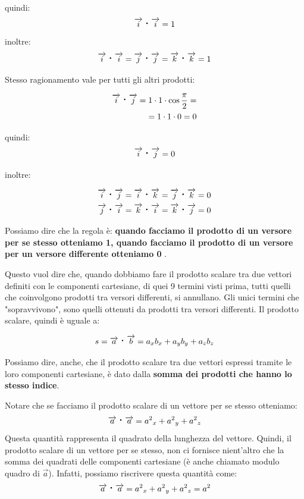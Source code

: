 quindi:
$$ \overrightarrow{i} \prodscal \overrightarrow{i} = 1$$
inoltre:
$$ \overrightarrow{i} \prodscal \overrightarrow{i} = \overrightarrow{j} \prodscal \overrightarrow{j} = \overrightarrow{k} \prodscal \overrightarrow{k} = 1 $$

Stesso ragionamento vale per tutti gli altri prodotti:

\begin{align*}
\overrightarrow{i} \prodscal \overrightarrow{j} = 1 	\cdot 1 \cdot \cos \frac{\pi}{2} = \\
 = 1 \cdot 1 \cdot 0 = 0
\end{align*}

quindi:
$$ \overrightarrow{i} \prodscal \overrightarrow{j} = 0 $$

inoltre:

\begin{align*}
\overrightarrow{i} \prodscal \overrightarrow{j} = \overrightarrow{i} \prodscal \overrightarrow{k} = \overrightarrow{j} \prodscal \overrightarrow{k} = 0 \\
\overrightarrow{j} \prodscal \overrightarrow{i} = \overrightarrow{k} \prodscal \overrightarrow{i} = \overrightarrow{k} \prodscal \overrightarrow{j} = 0
\end{align*}

Possiamo dire che la regola è: \textbf{quando facciamo il prodotto di un versore per se stesso otteniamo 1, quando facciamo il prodotto di un versore per un versore differente otteniamo 0} .

Questo vuol dire che, quando dobbiamo fare il prodotto scalare tra due vettori definiti con le componenti cartesiane,  di quei 9 termini visti prima, tutti quelli che coinvolgono prodotti tra versori differenti, si annullano. Gli unici termini che "sopravvivono", sono quelli ottenuti da prodotti tra versori differenti. Il prodotto scalare, quindi è uguale a:

$$ s =\overrightarrow{a} \prodscal \overrightarrow{b} = a_{x} b_{x} + a_{y} b_{y} + a_{z} b_{z} $$

Possiamo dire, anche, che il prodotto scalare tra due vettori espressi tramite le loro componenti cartesiane, è dato dalla \textbf{somma dei prodotti che hanno lo stesso indice}.

Notare che se facciamo il prodotto scalare di un vettore per se stesso otteniamo:
$$ \overrightarrow{a} \prodscal \overrightarrow{a} = {a^{2}}_{x} + {a^{2}}_{y} + {a^{2}}_{z} $$
Questa quantità rappresenta il quadrato della lunghezza del vettore. Quindi, il prodotto scalare di un vettore per se stesso, non ci fornisce nient'altro che la somma dei quadrati delle componenti cartesiane (è anche chiamato modulo quadro di $\overrightarrow{a} $). Infatti, possiamo riscrivere questa quantità come:
$$ \overrightarrow{a} \prodscal \overrightarrow{a} = {a^{2}}_{x} + {a^{2}}_{y} + {a^{2}}_{z} = a^{2} $$


